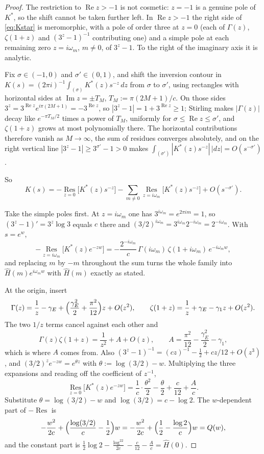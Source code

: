 \documentclass[11pt]{article}
\theoremstyle{definition}
\theoremstyle{remark}
\begin{document}
\begin{proof}
The restriction to $\operatorname{Re}z>-1$ is not cosmetic: $z=-1$ is a genuine pole of $K^*$, so
the shift cannot be taken further left. In $\operatorname{Re}z>-1$ the right side of
\eqref{eq:Kstar} is meromorphic, with a pole of order
three at $z=0$ (each of $\Gamma(z)$, $\zeta(1+z)$ and $(3^z-1)^{-1}$ contributing one) and a simple
pole at each remaining zero $z=i\omega_m$, $m\ne0$, of $3^z-1$. To the right of the imaginary axis
it is analytic.

\begin{sloppypar}
Fix $\sigma\in(-1,0)$ and $\sigma'\in(0,1)$, and shift the inversion contour in
$K(s)=(2\pi i)^{-1}\int_{(\sigma)}K^*(z)s^{-z}\,dz$ from $\sigma$ to $\sigma'$, using rectangles
with horizontal sides at $\operatorname{Im}z=\pm T_M$, $T_M:=\pi(2M+1)/c$. On those sides
$3^z=3^{\operatorname{Re}z}e^{i\pi(2M+1)}=-3^{\operatorname{Re}z}$, so $|3^z-1| =
1+3^{\operatorname{Re}z}\ge1$; Stirling makes $|\Gamma(z)|$ decay like $e^{-\pi T_M/2}$ times a
power of $T_M$, uniformly for $\sigma\le\operatorname{Re}z\le\sigma'$, and $\zeta(1+z)$ grows at
most polynomially there. The horizontal contributions therefore vanish as $M\to\infty$, the sum of
residues converges absolutely, and on the right vertical line $|3^z-1|\ge3^{\sigma'}-1>0$ makes
$\int_{(\sigma')}|K^*(z)s^{-z}|\,|dz| = O(s^{-\sigma'})$.
\end{sloppypar}
\noindent So
\[
K(s) = -\operatorname*{Res}_{z=0}\bigl[K^*(z)s^{-z}\bigr]
-\sum_{m\ne0}\operatorname*{Res}_{z=i\omega_m}\bigl[K^*(z)s^{-z}\bigr]+O(s^{-\sigma'}).
\]

Take the simple poles first. At $z=i\omega_m$ one has $3^{i\omega_m}=e^{2\pi im}=1$, so
$(3^z-1)'=3^z\log3$ equals $c$ there and $(3/2)^{i\omega_m}=3^{i\omega_m}2^{-i\omega_m}=
2^{-i\omega_m}$. With $s=e^w$,
\[
-\operatorname*{Res}_{z=i\omega_m}\bigl[K^*(z)e^{-zw}\bigr]
= -\frac{2^{-i\omega_m}}{c}\,\Gamma(i\omega_m)\,\zeta(1+i\omega_m)\,e^{-i\omega_m w},
\]
and replacing $m$ by $-m$ throughout the sum turns the whole family into $\hat H(m)e^{i\omega_m w}$
with $\hat H(m)$ exactly as stated.

At the origin, insert
\[
\Gamma(z) = \frac1z-\gamma_E+\Bigl(\frac{\gamma_E^2}{2}+\frac{\pi^2}{12}\Bigr)z+O(z^2), \qquad
\zeta(1+z) = \frac1z+\gamma_E-\gamma_1 z+O(z^2).
\]
The two $1/z$ terms cancel against each other and
\[
\Gamma(z)\zeta(1+z) = \frac{1}{z^2}+A+O(z), \qquad A = \frac{\pi^2}{12}-\frac{\gamma_E^2}{2}-\gamma_1,
\]
which is where $A$ comes from. Also $(3^z-1)^{-1} = (cz)^{-1}-\tfrac12+cz/12+O(z^3)$, and
$(3/2)^ze^{-zw}=e^{\theta z}$ with $\theta:=\log(3/2)-w$. Multiplying the three expansions and
reading off the coefficient of $z^{-1}$,
\[
\operatorname*{Res}_{z=0}\bigl[K^*(z)e^{-zw}\bigr]
= \frac1c\cdot\frac{\theta^2}{2}-\frac{\theta}{2}+\frac{c}{12}+\frac{A}{c}.
\]
Substitute $\theta=\log(3/2)-w$ and $\log(3/2)=c-\log2$. The $w$-dependent part of
$-\operatorname{Res}$ is
\[
-\frac{w^2}{2c}+\Bigl(\frac{\log(3/2)}{c}-\frac12\Bigr)w
= -\frac{w^2}{2c}+\Bigl(\frac12-\frac{\log2}{c}\Bigr)w = Q(w),
\]
and the constant part is
$\tfrac12\log2-\tfrac{\log^22}{2c}-\tfrac{c}{12}-\tfrac Ac = \hat H(0)$.


\end{proof}
\end{document}
